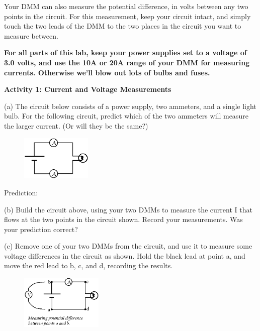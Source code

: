 Your DMM can also measure the potential difference, in volts between any two points in the circuit.  For this measurement, keep your circuit intact, and simply touch the two leads of the DMM to the two places in the circuit you want to measure between.

\begin{newboxed}
\textbf{For all parts of this lab, keep your power supplies set to a voltage of 3.0 volts, and use the 10A or 20A range of your DMM for measuring currents.  Otherwise we'll blow out lots of bulbs and fuses.}
\end{newboxed}

\vspace{0.1 in}
\textbf{Activity 1: Current and Voltage Measurements}

(a) The circuit below consists of a power supply, two ammeters, and a single light bulb.  For the following circuit, predict which of the two ammeters will measure the larger current.  (Or will they be the same?)

\begin{figure}
    \vspace{-0.4 in}
    \includegraphics[width=0.3\textwidth]{electric_circuits/circ_diag1.eps}
\end{figure}

\vspace{0.2 in}
Prediction:
\vspace{1.2 in}

\pagebreak
(b) Build the circuit above, using your two DMMs to measure the current I that flows at the two points in the circuit shown.  Record your measurements.  Was your prediction correct?
\vspace{1 in}

(c) Remove one of your two DMMs from the circuit, and use it to measure some voltage differences in the circuit as shown.  Hold the black lead at point a, and move the red lead to b, c, and d, recording the results.

\begin{figure}
    \vspace{-0.5 in}
    \includegraphics[width=0.35\textwidth]{electric_circuits/circ_diag2.eps}
\end{figure}

